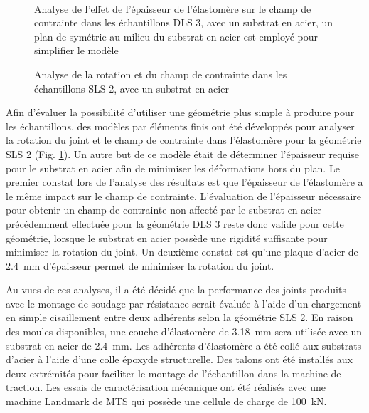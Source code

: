 \begin{figure}[h!]
	\centering
	\qquad
	 \\
	\caption{Analyse de l'effet de l'épaisseur de l'élastomère sur le champ de contrainte dans les échantillons DLS 3, avec un substrat en acier, un plan de symétrie au milieu du substrat en acier est employé pour simplifier le modèle}
	\label{fig:DLS_metal}
%
	\qquad
	\caption{Analyse de la rotation et du champ de contrainte dans les échantillons SLS 2, avec un substrat en acier}
	\label{fig:SLS_metal}
\end{figure}

Afin d'évaluer la possibilité d'utiliser une géométrie plus simple à produire pour les échantillons, des modèles par éléments finis ont été développés pour analyser la rotation du joint et le champ de contrainte dans l'élastomère pour la géométrie SLS 2 (Fig. \ref{fig:SLS_metal}). 
Un autre but de ce modèle était de déterminer l'épaisseur requise pour le substrat en acier afin de minimiser les déformations hors du plan.  
Le premier constat lors de l'analyse des résultats est que l'épaisseur de l'élastomère a le même impact sur le champ de contrainte. 
L'évaluation de l'épaisseur nécessaire pour obtenir un champ de contrainte non affecté par le substrat en acier précédemment effectuée pour la géométrie DLS 3 reste donc valide pour cette géométrie, lorsque le substrat en acier possède une rigidité suffisante pour minimiser la rotation du joint. 
Un deuxième constat est qu'une plaque d'acier de \SI{2.4}{\milli\metre} d'épaisseur permet de minimiser la rotation du joint. 

Au vues de ces analyses, il a été décidé que la performance des joints produits avec le montage de soudage par résistance serait évaluée à l'aide d'un chargement en simple cisaillement entre deux adhérents selon la géométrie SLS 2. 
En raison des moules disponibles, une couche d'élastomère de \SI{3.18}{\milli\metre} sera utilisée avec un substrat en acier de \SI{2.4}{\milli\metre}. 
Les adhérents d'élastomère a été collé aux substrats d'acier à l'aide d'une colle époxyde structurelle. 
Des talons ont été installés aux deux extrémités pour faciliter le montage de l'échantillon dans la machine de traction. 
Les essais de caractérisation mécanique ont été réalisés avec une machine Landmark de MTS qui possède une cellule de charge de \SI{100}{\kilo\newton}. 

